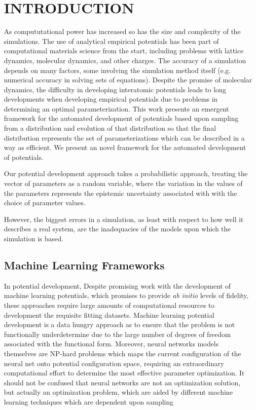 \chapter{INTRODUCTION}\label{intro}

As compututational power has increased so has the size and complexity of the simulations.
The use of analytical empirical potentials has been part of computational materials science from the start, including problems with lattice dynamics, molecular dynamics, and other charges.
The accuracy of a simulation depends on many factors, some involving the simulation method itself (e.g. numerical accuracy in solving sets of equations).
Despite the promise of molecular dynamics, the difficulty in developing interatomic potentials leads to long developments when developing empirical potentials due to problems in determining an optimal parameterization.
This work presents an emergent framework for the automated development of potentials based upon sampling from a distribution and evolution of that distribution so that the final distribution represents the set of parameterizations which can be described in a way as efficient.
We present an novel framework for the automated development of potentials.

Our potential development approach takes a probabilistic approach, treating the vector of parameters as a random variable, where the variation in the values of the parameters represents the epistemic uncertainty associated with with the choice of parameter values.

However, the biggest errors in a simulation, as least with respect to how well it describes a real system, are the inadequacies of the models upon which the simulation is based.

\section{Machine Learning Frameworks}

In potential development,
Despite promising work with the development of machine learning potentials, which promises to provide \emph{ab initio} levels of fidelity, these approaches require large amounts of computational resources to development the requisite fitting datasets.
Machine learning potential development is a data hungry approach as to ensure that the problem is not functionally underdetermine due to the large number of degrees of freedom associated with the functional form.
Moreover, neural networks models themselves are NP-hard problems which maps the current configuration of the neural net onto potential configuration space, requiring an extraordinary computational effort to determine the most effective parameter optimization.
It should not be confused that neural networks are not an optimization solution, but actually an optimization problem, which are aided by different machine learning techniques which are dependent upon sampling


